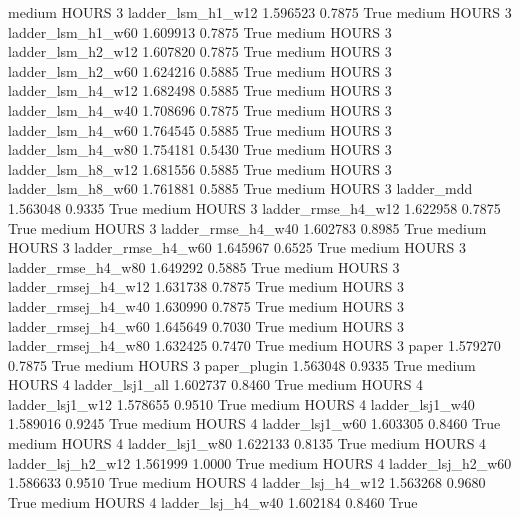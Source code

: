     medium    HOURS                 3   ladder_lsm_h1_w12   1.596523      0.7875    True
    medium    HOURS                 3   ladder_lsm_h1_w60   1.609913      0.7875    True
    medium    HOURS                 3   ladder_lsm_h2_w12   1.607820      0.7875    True
    medium    HOURS                 3   ladder_lsm_h2_w60   1.624216      0.5885    True
    medium    HOURS                 3   ladder_lsm_h4_w12   1.682498      0.5885    True
    medium    HOURS                 3   ladder_lsm_h4_w40   1.708696      0.7875    True
    medium    HOURS                 3   ladder_lsm_h4_w60   1.764545      0.5885    True
    medium    HOURS                 3   ladder_lsm_h4_w80   1.754181      0.5430    True
    medium    HOURS                 3   ladder_lsm_h8_w12   1.681556      0.5885    True
    medium    HOURS                 3   ladder_lsm_h8_w60   1.761881      0.5885    True
    medium    HOURS                 3          ladder_mdd   1.563048      0.9335    True
    medium    HOURS                 3  ladder_rmse_h4_w12   1.622958      0.7875    True
    medium    HOURS                 3  ladder_rmse_h4_w40   1.602783      0.8985    True
    medium    HOURS                 3  ladder_rmse_h4_w60   1.645967      0.6525    True
    medium    HOURS                 3  ladder_rmse_h4_w80   1.649292      0.5885    True
    medium    HOURS                 3 ladder_rmsej_h4_w12   1.631738      0.7875    True
    medium    HOURS                 3 ladder_rmsej_h4_w40   1.630990      0.7875    True
    medium    HOURS                 3 ladder_rmsej_h4_w60   1.645649      0.7030    True
    medium    HOURS                 3 ladder_rmsej_h4_w80   1.632425      0.7470    True
    medium    HOURS                 3               paper   1.579270      0.7875    True
    medium    HOURS                 3        paper_plugin   1.563048      0.9335    True
    medium    HOURS                 4     ladder_lsj1_all   1.602737      0.8460    True
    medium    HOURS                 4     ladder_lsj1_w12   1.578655      0.9510    True
    medium    HOURS                 4     ladder_lsj1_w40   1.589016      0.9245    True
    medium    HOURS                 4     ladder_lsj1_w60   1.603305      0.8460    True
    medium    HOURS                 4     ladder_lsj1_w80   1.622133      0.8135    True
    medium    HOURS                 4   ladder_lsj_h2_w12   1.561999      1.0000    True
    medium    HOURS                 4   ladder_lsj_h2_w60   1.586633      0.9510    True
    medium    HOURS                 4   ladder_lsj_h4_w12   1.563268      0.9680    True
    medium    HOURS                 4   ladder_lsj_h4_w40   1.602184      0.8460    True
